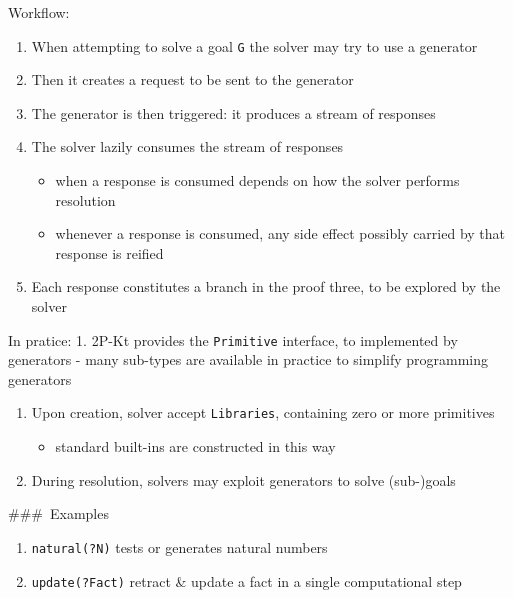 Workflow:

\begin{enumerate}
\def\labelenumi{\arabic{enumi}.}
\item
  When attempting to solve a goal \texttt{G} the solver may try to use a
  generator
\item
  Then it creates a request to be sent to the generator
\item
  The generator is then triggered: it produces a stream of responses
\item
  The solver lazily consumes the stream of responses

  \begin{itemize}
  \tightlist
  \item
    when a response is consumed depends on how the solver performs
    resolution
  \item
    whenever a response is consumed, any side effect possibly carried by
    that response is reified
  \end{itemize}
\item
  Each response constitutes a branch in the proof three, to be explored
  by the solver
\end{enumerate}

In pratice: 1. 2P-Kt provides the \texttt{Primitive} interface, to
implemented by generators - many sub-types are available in practice to
simplify programming generators

\begin{enumerate}
\def\labelenumi{\arabic{enumi}.}
\setcounter{enumi}{1}
\tightlist
\item
  Upon creation, solver accept \texttt{Libraries}, containing zero or
  more primitives

  \begin{itemize}
  \tightlist
  \item
    standard built-ins are constructed in this way
  \end{itemize}
\item
  During resolution, solvers may exploit generators to solve (sub-)goals
\end{enumerate}

\#\#\#~Examples

\begin{enumerate}
\def\labelenumi{\arabic{enumi}.}
\item
  \texttt{natural(?N)} tests or generates natural numbers
\item
  \texttt{update(?Fact)} retract \& update a fact in a single
  computational step
\end{enumerate}

